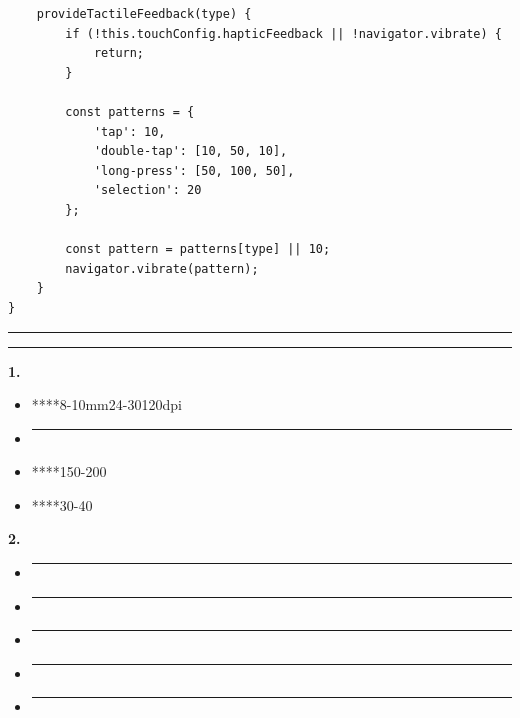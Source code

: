 \begin{verbatim}
    provideTactileFeedback(type) {
        if (!this.touchConfig.hapticFeedback || !navigator.vibrate) {
            return;
        }
        
        const patterns = {
            'tap': 10,
            'double-tap': [10, 50, 10],
            'long-press': [50, 100, 50],
            'selection': 20
        };
        
        const pattern = patterns[type] || 10;
        navigator.vibrate(pattern);
    }
}
\end{verbatim}

\begin{center}\rule{0.5\linewidth}{0.5pt}\end{center}

\begin{center}\rule{0.5\linewidth}{0.5pt}\end{center}

\textbf{1. }

\begin{itemize}
\item
  ****8-10mm24-30120dpi
\item
  \begin{center}\rule{0.5\linewidth}{0.5pt}\end{center}
\item
  ****150-200
\item
  ****30-40
\end{itemize}

\textbf{2. }

\begin{itemize}
\item
  \begin{center}\rule{0.5\linewidth}{0.5pt}\end{center}
\item
  \begin{center}\rule{0.5\linewidth}{0.5pt}\end{center}
\item
  \begin{center}\rule{0.5\linewidth}{0.5pt}\end{center}
\item
  \begin{center}\rule{0.5\linewidth}{0.5pt}\end{center}
\item
  \begin{center}\rule{0.5\linewidth}{0.5pt}\end{center}
\end{itemize}

